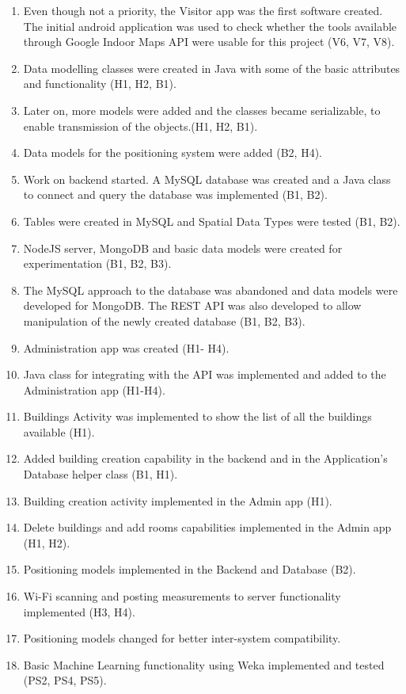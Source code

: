 \begin{enumerate}
	\item Even though not a priority, the Visitor app was the first software created. The initial android application was used to check whether the tools available through Google Indoor Maps API were usable for this project (V6, V7, V8).
	\item Data modelling classes were created in Java with some of the basic attributes and functionality (H1, H2, B1).
	\item Later on, more models were added and the classes became serializable, to enable transmission of the objects.(H1, H2, B1).
	\item Data models for the positioning system were added (B2, H4).
	\item Work on backend started. A MySQL database was created and a Java class to connect and query the database was implemented (B1, B2).
	\item Tables were created in MySQL and Spatial Data Types were tested (B1, B2).
	\item NodeJS server, MongoDB and basic data models were created for experimentation (B1, B2, B3).
	\item The MySQL approach to the database was abandoned and data models were developed for MongoDB. The REST API was also developed to allow manipulation of the newly created database (B1, B2, B3).
	\item  Administration app was created (H1- H4).
	\item Java class for integrating with the API was implemented and added to the Administration app (H1-H4).
	\item Buildings Activity was implemented to show the list of all the buildings available (H1).
	\item Added building creation capability in the backend and in the Application's Database helper class (B1, H1).
	\item Building creation activity implemented in the Admin app (H1).
	\item Delete buildings and add rooms capabilities implemented in the Admin app (H1, H2).
	\item Positioning models implemented in the Backend and Database (B2).
	\item Wi-Fi scanning and posting measurements to server functionality implemented (H3, H4). 
	\item Positioning models changed for better inter-system compatibility.
	\item Basic Machine Learning functionality using Weka implemented and tested (PS2, PS4, PS5).

\end{enumerate}
